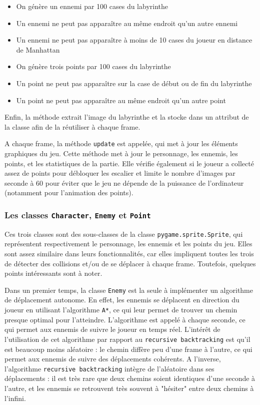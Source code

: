 \documentclass[12pt]{scrreprt} %
\begin{document}
\begin{itemize}
    \item On génère un ennemi par 100 cases du labyrinthe
    \item Un ennemi ne peut pas apparaître au même endroit qu'un autre ennemi
    \item Un ennemi ne peut pas apparaître à moins de 10 cases du joueur en distance de Manhattan
    \item On génère trois points par 100 cases du labyrinthe
    \item Un point ne peut pas apparaître sur la case de début ou de fin du labyrinthe
    \item Un point ne peut pas apparaître au même endroit qu'un autre point
\end{itemize}

Enfin, la méthode extrait l'image du labyrinthe et la stocke dans un attribut de la classe afin de la réutiliser à chaque frame.

A chaque frame, la méthode \texttt{update} est appelée, qui met à jour les éléments graphiques du jeu. Cette méthode met à jour le personnage, les ennemis, les points, et les statistiques de la partie. Elle vérifie également si le joueur a collecté assez de points pour débloquer les escalier et limite le nombre d'images par seconde à 60 pour éviter que le jeu ne dépende de la puissance de l'ordinateur (notamment pour l'animation des points).

\subsubsection{Les classes \texttt{Character}, \texttt{Enemy} et \texttt{Point}}

Ces trois classes sont des sous-classes de la classe \texttt{pygame.sprite.Sprite}, qui représentent respectivement le personnage, les ennemis et les points du jeu. Elles sont assez similaire dans leurs fonctionnalités, car elles impliquent toutes les trois de détecter des collisions et/ou de se déplacer à chaque frame. Toutefois, quelques points intéressants sont à noter.

Dans un premier temps, la classe \texttt{Enemy} est la seule à implémenter un algorithme de déplacement autonome. En effet, les ennemis se déplacent en direction du joueur en utilisant l'algorithme \texttt{A*}, ce qui leur permet de trouver un chemin presque optimal pour l'atteindre. L'algorithme est appelé à chaque seconde, ce qui permet aux ennemis de suivre le joueur en temps réel. L'intérêt de l'utilisation de cet algorithme par rapport au \texttt{recursive backtracking} est qu'il est beaucoup moins aléatoire : le chemin diffère peu d'une frame à l'autre, ce qui permet aux ennemis de suivre des déplacements cohérents. A l'inverse, l'algorithme \texttt{recursive backtracking} intègre de l'aléatoire dans ses déplacements : il est très rare que deux chemins soient identiques d'une seconde à l'autre, et les ennemis se retrouvent très souvent à "hésiter" entre deux chemins à l'infini.
\end{document}
